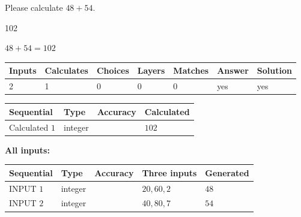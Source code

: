 \documentclass[12pt]{article}
\begin{document}
  
 
Please calculate $ %
48 +  %
54 $.
 
 
 
\noindent{}
 
 

102
 
 
\noindent{}
 
 

 
 
 
\noindent{}
 
 

$ %
48 +  %
54=   %
102$
 
 
\noindent{}
 
 

 
   
   
   
   
\noindent\begin{tabular}{|l|l|l|l|l|l|l|}
 \hline
Inputs & Calculates & Choices & Layers & Matches & Answer & Solution \\ \hline
 2  & 
 1  & 
 0
  & 
 0  & 
 0  & 
  yes & 
  yes 
  \\ \hline
 \end{tabular}
   
   
   
   
\noindent{}
   
   
  
  
\noindent\begin{tabular}{|l|l|l|l|}
\hline
 Sequential & Type & Accuracy & Calculated \\ 
\hline
 
 
  Calculated $  1 $ & integer &  & 
  $ 102 $ 
 \\  \hline  
 \end{tabular}
   
   
   
   
\noindent\vspace{0.1in}\hspace{-0.08in} {\textbf{\Large{All inputs: }}}
   
   
  
  
\noindent\begin{tabular}{|l|l|l|l|l|}
\hline
 Sequential & Type & Accuracy & Three inputs & Generated \\ 
\hline
 
 
  INPUT $  1 $ & integer &  & $
 20
 , 
 60
 , 
 2
 $ & $ 48 $ 
 \\  \hline  
 
 
  INPUT $  2 $ & integer &  & $
 40
 , 
 80
 , 
 7
 $ & $ 54 $ 
 \\  \hline  
 \end{tabular}
   
\end{document}
